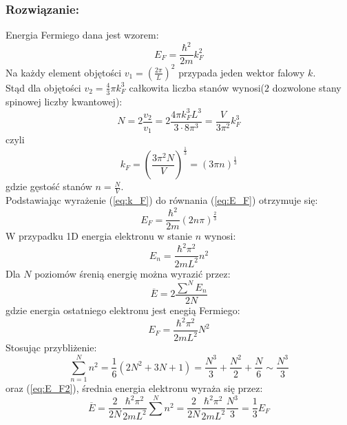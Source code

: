\subsubsection*{Rozwiązanie:}
Energia Fermiego dana jest wzorem:
\begin{equation}
\label{eq:E_F}
E_F = \frac{\hbar^2}{2m}k_F^2
\end{equation}
Na każdy element objętości $v_1 = \left(\frac{2\pi}{L}\right)^2$ przypada jeden wektor falowy $k$.\\
Stąd dla objętości $v_2 = \frac{4}{3}\pi k_F^3$ całkowita liczba stanów wynosi($2$ dozwolone stany spinowej liczby kwantowej):
\begin{equation}
N = 2 \frac{v_2}{v_1} = 2 \frac{4\pi k_F^3 L^3}{3\cdot 8 \pi^3} =  \frac{V}{3\pi^2}k_F^3
\end{equation}
czyli
\begin{equation}
\label{eq:k_F}
k_F = \left( \frac{3 \pi^2 N}{V} \right)^{\frac{1}{3}} =  (3\pi n)^{\frac{1}{3}}
\end{equation} 
gdzie gęstość stanów $n = \frac{N}{V}$.\\
Podstawiając wyrażenie (\ref{eq:k_F}) do równania (\ref{eq:E_F}) otrzymuje się:
\begin{equation}
E_F = \frac{\hbar^2}{2m} (2n\pi)^{\frac{2}{3}}
\end{equation} 
\hrulefill
\newline
W przypadku 1D energia elektronu w stanie $n$ wynosi:
\begin{equation}
E_n = \frac{\hbar^2 \pi^2}{2mL^2}n^2
\end{equation}
Dla  $N$ poziomów śrenią energię można wyrazić przez:
\begin{equation}
\overline{E} = 2 \frac{\sum^N E_n}{2N}
\end{equation}
gdzie energia ostatniego elektronu jest enegią Fermiego:
\begin{equation}
\label{eq:E_F2}
E_F = \frac{\hbar^2 \pi^2}{2mL^2} N^2
\end{equation}
Stosując przybliżenie:
\begin{equation}
\sum^N_{n=1} n^2 = \frac{1}{6}(2N^2 + 3N + 1) = \frac{N^3}{3} + \frac{N^2}{2} + \frac{N}{6} \sim \frac{N^3}{3}
\end{equation} 
oraz (\ref{eq:E_F2}), średnia energia elektronu wyraża się przez:
\begin{equation}
\overline{E} = \frac{2}{2N} \frac{\hbar^2 \pi^2}{2mL^2} \sum^N n^2 = \frac{2}{2N} \frac{\hbar^2 \pi^2}{2mL^2} \frac{N^3}{3} = \frac{1}{3} E_F
\end{equation}




